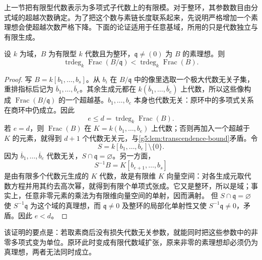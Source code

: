 上一节把有限型代数表示为多项式子代数上的有限模。对于整环，其参数数目由分式域的超越次数确定。为了把这个数与素链长度联系起来，先说明严格增加一个素理想会使超越次数严格下降。下面的论证适用于任意基域，所用的只是代数独立与有限生成。

\begin{lemma}\label{g5:lem:strict-prime-transcendence-drop}
	设 \(k\) 为域，\(B\) 为有限型 \(k\) 代数且为整环，\(\mathfrak q\ne(0)\) 为 \(B\) 的素理想。则
	\[
	\operatorname{trdeg}_k\operatorname{Frac}(B/\mathfrak q)
	<\operatorname{trdeg}_k\operatorname{Frac}(B).
	\]
\end{lemma}
\begin{proof}
	写 \(B=k[b_1,\ldots,b_s]\)。从 \(b_i\) 在 \(B/\mathfrak q\) 中的像里选取一个极大代数无关子集，重排指标后记为 \(\overline b_1,\ldots,\overline b_e\)。其余生成元都在 \(k(\overline b_1,\ldots,\overline b_e)\) 上代数，所以这些像构成 \(\operatorname{Frac}(B/\mathfrak q)\) 的一个超越基。\(b_1,\ldots,b_e\) 本身也代数无关：原环中的多项式关系在商环中仍成立。因此
	\[
	e\leq d=\operatorname{trdeg}_k\operatorname{Frac}(B).
	\]
	若 \(e=d\)，则 \(\operatorname{Frac}(B)\) 在 \(K=k(b_1,\ldots,b_e)\) 上代数；否则再加入一个超越于 \(K\) 的元素，就得到 \(d+1\) 个代数无关元，与\cref{g5:lem:transcendence-bound}矛盾。令
	\[
	S=k[b_1,\ldots,b_e]\setminus\{0\}.
	\]
	因为 \(\overline b_1,\ldots,\overline b_e\) 代数无关，\(S\cap\mathfrak q=\varnothing\)。另一方面，
	\[
	S^{-1}B=K[b_{e+1},\ldots,b_s]
	\]
	是由有限多个代数元生成的 \(K\) 代数，故是有限维 \(K\) 向量空间：对各生成元取代数方程并用其约去高次幂，就得到有限个单项式张成。它又是整环，所以是域；事实上，任意非零元素的乘法为有限维向量空间的单射，因而满射。
	但 \(S\cap\mathfrak q=\varnothing\) 使 \(S^{-1}\mathfrak q\) 为这个域的真理想，而 \(\mathfrak q\ne0\) 及整环的局部化单射性又使 \(S^{-1}\mathfrak q\ne0\)，矛盾。因此 \(e<d\)。
\end{proof}

该证明的要点是：若取素商后没有损失代数无关参数，就能同时把这些参数中的非零多项式变为单位。原环此时变成有限代数域扩张，原来非零的素理想却必须仍为真理想，两者无法同时成立。

